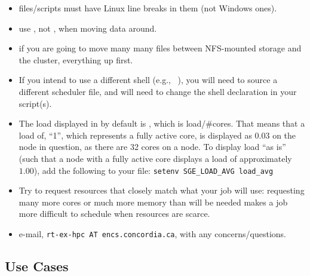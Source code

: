\documentclass{easychair}
\begin{document}
\begin{itemize}
\item
files/scripts must have Linux line breaks in them (not Windows ones).
\item
use , not , when moving data around. 
\item
if you are going to move many many files between NFS-mounted storage and the 
cluster,  everything up first. 
\item
If you intend to use a different shell (e.g., ~\cite{aosa-book-vol1-bash}), you will need to source a different scheduler file, and will need to change the shell declaration in your script(s).
\item
The load displayed in  by default is , which is load/\#cores. That means that a load of, ``1'', which represents a fully active core, is displayed as $0.03$ on the node in question, as there are 32 cores on a node. To display load ``as is'' (such that a node with a fully active core displays a load of approximately $1.00$), add the following to your  file: \texttt{setenv SGE\_LOAD\_AVG load\_avg}
\item
Try to request resources that closely match what your job will use: requesting many more cores or much more memory than will be needed makes a job more difficult to schedule when resources are scarce.
\item
e-mail, \texttt{rt-ex-hpc AT encs.concordia.ca}, with any concerns/questions.
\end{itemize}

\subsection{Use Cases}
\end{document}

